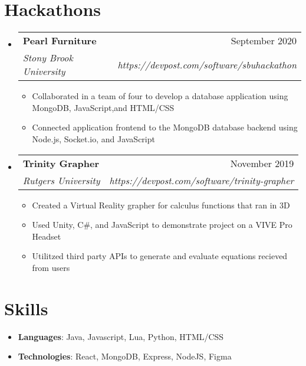 \documentclass[letterpaper,11pt]{article}
\makeatletter
\newcommand{\resumeItem}[2]{
  \item\small{
    \textbf{#1}{: #2 \vspace{-2pt}}
  }
}
\newcommand{\resumeSubheading}[4]{
  \vspace{-1pt}\item
    \begin{tabular*}{0.97\textwidth}[t]{l@{\extracolsep{\fill}}r}
      \textbf{#1} & #2 \\
      \textit{\small#3} & \textit{\small #4} \\
    \end{tabular*}\vspace{-5pt}
}
\newcommand{\resumeSubItem}[2]{\resumeItem{#1}{#2}\vspace{-4pt}}
\newcommand{\resumeSubHeadingListStart}{\begin{itemize}[leftmargin=*]}
\newcommand{\resumeSubHeadingListEnd}{\end{itemize}}
\makeatother
\begin{document}
  \section{Hackathons}
  \resumeSubHeadingListStart
    \resumeSubheading
      {Pearl Furniture}{September 2020}
      {Stony Brook University}{https://devpost.com/software/sbuhackathon}
      {\begin{itemize}
        \item Collaborated in a team of four to develop a database application using MongoDB, JavaScript,and HTML/CSS
        \item Connected application frontend to the MongoDB database backend using Node.js, Socket.io, and JavaScript
      \end{itemize}
      }
    \resumeSubheading
      {Trinity Grapher}{November 2019}
      {Rutgers University}{https://devpost.com/software/trinity-grapher}
      {\begin{itemize}
        \item Created a Virtual Reality grapher for calculus functions that ran in 3D
        \item Used Unity, C\#, and JavaScript to demonstrate project on a VIVE Pro Headset
        \item Utilitzed third party APIs to generate and evaluate equations recieved from users
      \end{itemize}
      }
    
  \resumeSubHeadingListEnd

  \section{Skills}
  \resumeSubHeadingListStart
    \resumeSubItem{Languages}
      {Java, Javascript, Lua, Python, HTML/CSS}
      \resumeSubItem{Technologies}
      {React, MongoDB, Express, NodeJS, Figma}
   \resumeSubHeadingListEnd



\end{document}
